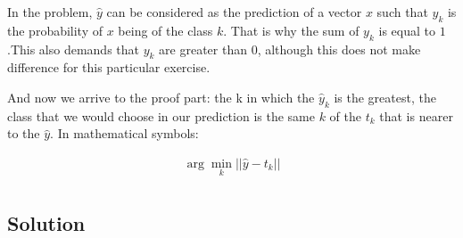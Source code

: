 \documentclass[10pt,a4paper]{article}
\begin{document}
	In the problem, $\hat{y}$ can be considered as the prediction of a vector $x$ such that $y_k$ is the probability of $x$ being of the class $k$. That is why the sum of $y_k$ is equal to $1$.This also demands that $y_k$ are greater than $0$, although this does not make difference for this particular exercise.
	
	And now we arrive to the proof part: the k in which the $\hat{y}_k$ is the greatest, the class that we would choose in our prediction is the same $k$ of the $t_k$ that is nearer to the $\hat{y}$. In mathematical symbols:
	
	\begin{align*}
		\arg\min_k ||\hat{y}-t_k||\\
	\end{align*}	
	
	\subsection{Solution}
	
\end{document}
